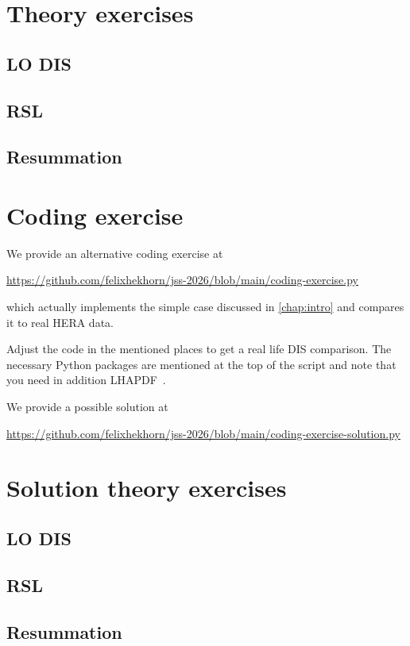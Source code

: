 \chapter{Theory exercises}

\section{LO DIS}
\label{app:LO}


\section{RSL}
\label{app:RSL}


\section{Resummation}


\chapter{Coding exercise}
We provide an alternative coding exercise at
\begin{center}
    \url{https://github.com/felixhekhorn/jss-2026/blob/main/coding-exercise.py}
\end{center}
which actually implements the simple case discussed in \cref{chap:intro} and compares it to real HERA data.

Adjust the code in the mentioned places to get a real life DIS comparison.
The necessary Python packages are mentioned at the top of the script and note that you need in addition LHAPDF~\cite{Buckley:2014ana}.

We provide a possible solution at
\begin{center}
    \url{https://github.com/felixhekhorn/jss-2026/blob/main/coding-exercise-solution.py}
\end{center}

\chapter{Solution theory exercises}
\section{LO DIS}


\section{RSL}


\section{Resummation}


